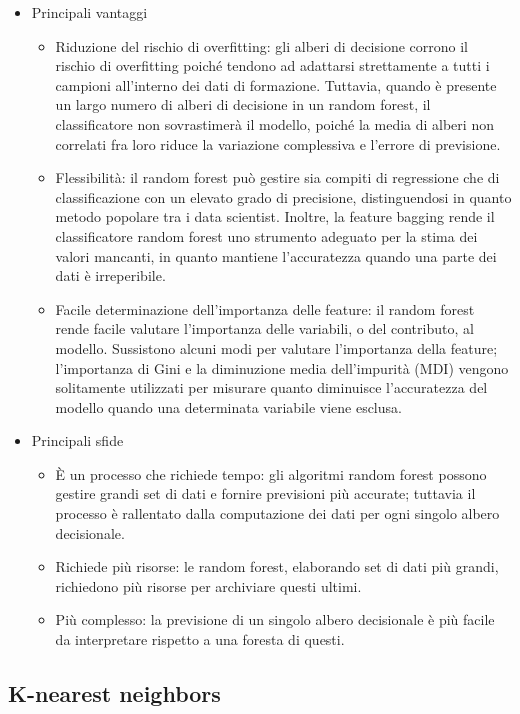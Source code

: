 \begin{itemize}
  \item Principali vantaggi
  \begin{itemize}
    \item Riduzione del rischio di overfitting: gli alberi di decisione corrono il rischio di overfitting poiché tendono ad adattarsi strettamente a tutti i campioni all'interno dei dati di formazione. 
    Tuttavia, quando è presente un largo numero di alberi di decisione in un random forest, il classificatore non sovrastimerà il modello, poiché la media di alberi non correlati fra loro riduce la variazione complessiva e l'errore di previsione.
    \item Flessibilità: il random forest può gestire sia compiti di regressione che di classificazione con un elevato grado di precisione, distinguendosi in quanto metodo popolare tra i data scientist. 
    Inoltre, la feature bagging rende il classificatore random forest uno strumento adeguato per la stima dei valori mancanti, in quanto mantiene l'accuratezza quando una parte dei dati è irreperibile.
    \item Facile determinazione dell'importanza delle feature: il random forest rende facile valutare l'importanza delle variabili, o del contributo, al modello. 
    Sussistono alcuni modi per valutare l'importanza della feature; l’importanza di Gini e la diminuzione media dell'impurità (MDI) vengono solitamente utilizzati per misurare quanto diminuisce l'accuratezza del modello quando una determinata variabile viene esclusa.
  \end{itemize}
  \item Principali sfide
  \begin{itemize}
    \item È un processo che richiede tempo: gli algoritmi random forest possono gestire grandi set di dati e fornire previsioni più accurate; tuttavia il processo è rallentato dalla computazione dei dati per ogni singolo albero decisionale.
    \item Richiede più risorse: le random forest, elaborando set di dati più grandi, richiedono più risorse per archiviare questi ultimi.
    \item Più complesso: la previsione di un singolo albero decisionale è più facile da interpretare rispetto a una foresta di questi.
  \end{itemize}
\end{itemize}


\subsection{K-nearest neighbors}
\cite{KNNibm}

